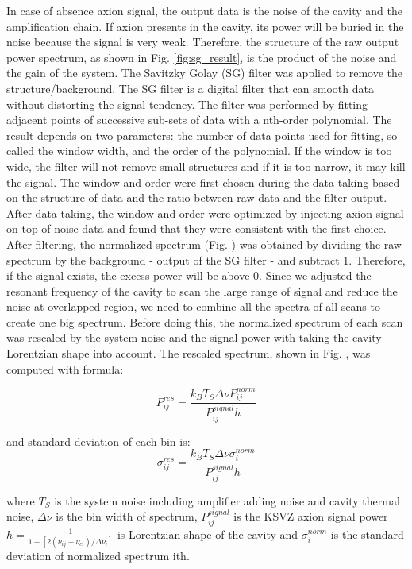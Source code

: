 In case of absence axion signal, the output data is the noise of the cavity and the amplification chain. If axion presents in the cavity, its power will be buried in the noise because the signal is very weak. Therefore, the structure of the raw output power spectrum, as shown in Fig. \ref{fig:sg_result}, is the product of the noise and the gain of the system. The Savitzky Golay (SG) filter \cite{SGFilter} was applied to remove the structure/background. The SG filter is a digital filter that can smooth data without distorting the signal tendency. The filter was performed by fitting adjacent points of successive sub-sets of data with a nth-order polynomial. The result depends on two parameters: the number of data points used for fitting, so-called the window width, and the order of the polynomial. If the window is too wide, the filter will not remove small structures and if it is too narrow, it may kill the signal. The window and order were first chosen during the data taking based on the structure of data and the ratio between raw data and the filter output. After data taking, the window and order were optimized by injecting axion signal on top of noise data and found that they were consistent with the first choice.
After filtering, the normalized spectrum (Fig. \cite{fig:}) was obtained by dividing the raw spectrum by the background - output of the SG filter - and subtract 1. Therefore, if the signal exists, the excess power will be above 0.
Since we adjusted the resonant frequency of the cavity to scan the large range of signal and reduce the noise at overlapped region, we need to combine all the spectra of all scans to create one big spectrum. Before doing this, the normalized spectrum of each scan was rescaled by the system noise and the signal power with taking the cavity Lorentzian shape into account. The rescaled spectrum, shown in Fig. \cite{}, was computed with formula:

\begin{equation}
  \label{eq:respower_eqn}
  P_{ij}^{res} = \frac{k_{B}T_{S}\Delta\nu P_{ij}^{norm}}{P_{ij}^{signal} h}
\end{equation}

and standard deviation of each bin is:
\begin{equation}
  \label{eq:ressigma_eqn}
  \sigma_{ij}^{res} = \frac{k_{B}T_{S}\Delta\nu \sigma_{i}^{norm}}{P_{ij}^{signal} h}
\end{equation}

where $T_{S}$ is the system noise including amplifier adding noise and cavity thermal noise, $\Delta\nu$ is the bin width of spectrum, $P_{ij}^{signal}$ is the KSVZ axion signal power
$h = \frac{1}{1 + [2(\nu_{ij} - \nu_{ci})/\Delta\nu_{i}]}$ is Lorentzian shape of the cavity
and $\sigma_{i}^{norm}$ is the standard deviation of normalized spectrum ith.

